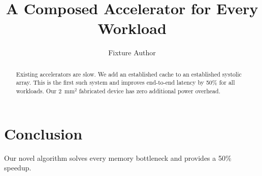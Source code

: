 \documentclass{article}
\title{A Composed Accelerator for Every Workload}
\author{Fixture Author}
\begin{document}
\maketitle
\begin{abstract}
Existing accelerators are slow. We add an established cache to an established systolic array.
This is the first such system and improves end-to-end latency by 50\% for all workloads.
Our 2~mm$^2$ fabricated device has zero additional power overhead.
\end{abstract}



\section{Conclusion}
Our novel algorithm solves every memory bottleneck and provides a 50\% speedup.


\end{document}
